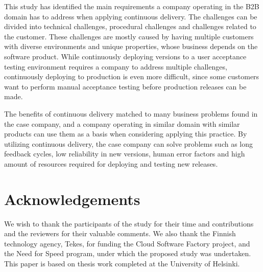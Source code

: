 \documentclass[lnbip]{svmultln}
\begin{document}
This study has identified the main requirements a company operating in the B2B domain has to address when applying continuous delivery. The challenges can be divided into technical challenges, procedural challenges and challenges related to the customer. These challenges are mostly caused by having multiple customers with diverse environments and unique properties, whose business depends on the software product. While continuously deploying versions to a user acceptance testing environment requires a company to address multiple challenges, continuously deploying to production is even more difficult, since some customers want to perform manual acceptance testing before production releases can be made. 

The benefits of continuous delivery matched to many business problems found in the case company, and a company operating in similar domain with similar products can use them as a basis when considering applying this practice. By utilizing continuous delivery, the case company can solve problems such as long feedback cycles, low reliability in new versions, human error factors and high amount of resources required for deploying and testing new releases. 

\section{Acknowledgements}
We wish to thank the participants of the study for their time and contributions and the reviewers for their valuable comments. We also thank the Finnish technology agency, Tekes, for funding the Cloud Software Factory project, and the Need for Speed program, under which the proposed study was undertaken. This paper is based on thesis work \cite{gradu} completed at the University of Helsinki.
\end{document}
